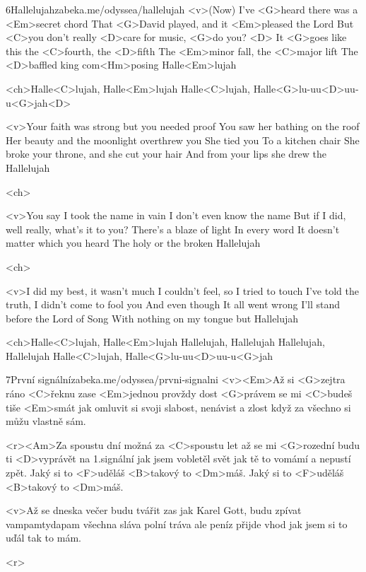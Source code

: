 \begin{song}{6}{Hallelujah}{zabeka.me/odyssea/hallelujah}
	<v>(Now) I've <G>heard there was a <Em>secret chord
	That <G>David played, and it <Em>pleased the Lord
	But <C>you don't really <D>care for music, <G>do you? <D>
	It <G>goes like this the <C>fourth, the <D>fifth
	The <Em>minor fall, the <C>major lift
	The <D>baffled king com<Hm>posing Halle<Em>lujah

	<ch>Halle<C>lujah, Halle<Em>lujah
	Halle<C>lujah, Halle<G>lu-uu<D>uu-u<G>jah<D>

	<v>Your faith was strong but you needed proof
	You saw her bathing on the roof
	Her beauty and the moonlight overthrew you
	She tied you
	To a kitchen chair
	She broke your throne, and she cut your hair
	And from your lips she drew the Hallelujah

	<ch>

	<v>You say I took the name in vain
	I don't even know the name
	But if I did, well really, what's it to you?
	There's a blaze of light
	In every word
	It doesn't matter which you heard
	The holy or the broken Hallelujah

	<ch>

	<v>I did my best, it wasn't much
	I couldn't feel, so I tried to touch
	I've told the truth, I didn't come to fool you
	And even though
	It all went wrong
	I'll stand before the Lord of Song
	With nothing on my tongue but Hallelujah

	<ch>Halle<C>lujah, Halle<Em>lujah
	Hallelujah, Hallelujah
	Hallelujah, Hallelujah
	Halle<C>lujah, Halle<G>lu-uu<D>uu-u<G>jah
\end{song}
\begin{song}[Chinaski]{7}{První signální}{zabeka.me/odyssea/prvni-signalni}
	<v><Em>Až si <G>zejtra ráno <C>řeknu zase
	<Em>jednou provždy dost
	<G>právem se mi <C>budeš tiše <Em>smát
	jak omluvit si svoji slabost, nenávist a zlost
	když za všechno si můžu vlastně sám.

	<r><Am>Za spoustu dní možná za <C>spoustu let
	až se mi <G>rozední budu ti <D>vyprávět
	na 1.signální jak jsem vobletěl svět
	jak tě to vomámí a nepustí zpět.
	Jaký si to <F>uděláš <B>takový to <Dm>máš.
	Jaký si to <F>uděláš <B>takový to <Dm>máš.

	<v>Až se dneska večer budu tvářit zas jak Karel Gott,
	budu zpívat vampamtydapam
	všechna sláva polní tráva ale peníz přijde vhod
	jak jsem si to uďál tak to mám.

	<r>
\end{song}
